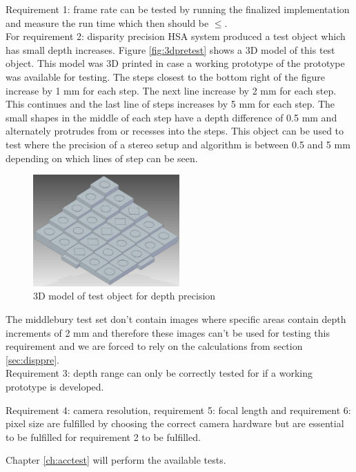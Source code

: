 



Requirement 1: frame rate can be tested by running the finalized implementation and measure the run time which then should be $\leq $. \\

For requirement 2: disparity precision HSA system produced a test object which has small depth increases. Figure \vref{fig:3dpretest} shows a 3D model of this test object. This model was 3D printed in case a working prototype of the prototype was available for testing. The steps closest to the bottom right of the figure increase by 1 mm for each step. The next line increase by 2 mm for each step. This continues and the last line of steps increases by 5 mm for each step. The small shapes in the middle of each step have a depth difference of 0.5 mm and alternately protrudes from or recesses into the steps. This object can be used to test where the precision of a stereo setup and algorithm is between 0.5 and 5 mm depending on which lines of step can be seen. \\

\begin{figure}[ht!]
  \centering
  \includegraphics[width=0.5\textwidth]{figures/3dprecisiontest}
  \caption{3D model of test object for depth precision}
  \label{fig:3dpretest}
\end{figure}
The middlebury test set don't contain images where specific areas contain depth increments of 2 mm and therefore these images can't be used for testing this requirement and we are forced to rely on the calculations from section \vref{sec:disppre}. \\

Requirement 3: depth range can only be correctly tested for if a working prototype is developed.

Requirement 4: camera resolution, requirement 5: focal length and requirement 6: pixel size are fulfilled by choosing the correct camera hardware but are essential to be fulfilled for requirement 2 to be fulfilled.

Chapter \vref{ch:acctest} will perform the available tests.

